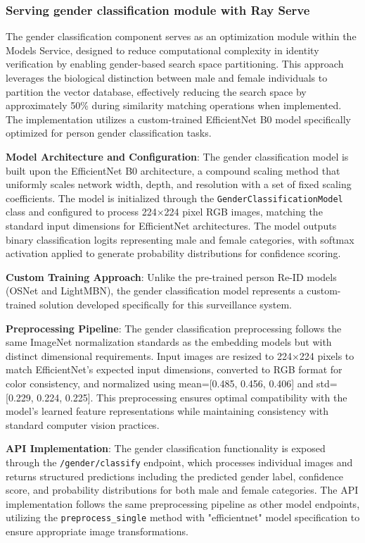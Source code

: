 \subsubsection{Serving gender classification module with Ray Serve}

The gender classification component serves as an optimization module within the Models Service, designed to reduce computational complexity in identity verification by enabling gender-based search space partitioning. This approach leverages the biological distinction between male and female individuals to partition the vector database, effectively reducing the search space by approximately 50\% during similarity matching operations when implemented. The implementation utilizes a custom-trained EfficientNet B0 model specifically optimized for person gender classification tasks.

\textbf{Model Architecture and Configuration}: The gender classification model is built upon the EfficientNet B0 architecture, a compound scaling method that uniformly scales network width, depth, and resolution with a set of fixed scaling coefficients. The model is initialized through the \texttt{GenderClassificationModel} class and configured to process 224×224 pixel RGB images, matching the standard input dimensions for EfficientNet architectures. The model outputs binary classification logits representing male and female categories, with softmax activation applied to generate probability distributions for confidence scoring.

\textbf{Custom Training Approach}: Unlike the pre-trained person Re-ID models (OSNet and LightMBN), the gender classification model represents a custom-trained solution developed specifically for this surveillance system.

\textbf{Preprocessing Pipeline}: The gender classification preprocessing follows the same ImageNet normalization standards as the embedding models but with distinct dimensional requirements. Input images are resized to 224×224 pixels to match EfficientNet's expected input dimensions, converted to RGB format for color consistency, and normalized using mean=[0.485, 0.456, 0.406] and std=[0.229, 0.224, 0.225]. This preprocessing ensures optimal compatibility with the model's learned feature representations while maintaining consistency with standard computer vision practices.

\textbf{API Implementation}: The gender classification functionality is exposed through the \texttt{/gender/classify} endpoint, which processes individual images and returns structured predictions including the predicted gender label, confidence score, and probability distributions for both male and female categories. The API implementation follows the same preprocessing pipeline as other model endpoints, utilizing the \texttt{preprocess\_single} method with "efficientnet" model specification to ensure appropriate image transformations.

